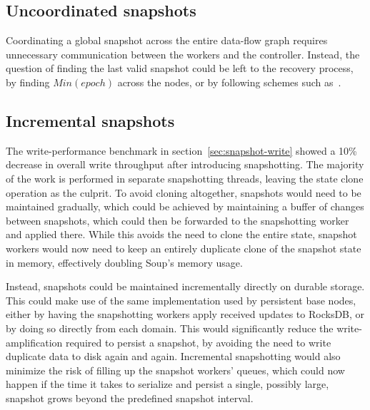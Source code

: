 \subsection{Uncoordinated snapshots}

Coordinating a global snapshot across the entire data-flow graph requires
unnecessary communication between the workers and the controller. Instead, the
question of finding the last valid snapshot could be left to the recovery
process, \eg by finding $ Min(epoch) $ across the nodes, or by following schemes
such as~\cite{falkirk}.

\subsection{Incremental snapshots}

The write-performance benchmark in section~\ref{sec:snapshot-write} showed a
10\% decrease in overall write throughput after introducing snapshotting. The
majority of the work is performed in separate snapshotting threads, leaving the
state clone operation as the culprit. To avoid cloning altogether, snapshots
would need to be maintained gradually, which could be achieved by maintaining a
buffer of changes between snapshots, which could then be forwarded to the
snapshotting worker and applied there. While this avoids the need to clone the
entire state, snapshot workers would now need to keep an entirely duplicate
clone of the snapshot state in memory, effectively doubling Soup's memory usage.

Instead, snapshots could be maintained incrementally directly on durable
storage. This could make use of the same  implementation
used by persistent base nodes, either by having the snapshotting workers apply
received updates to RocksDB, or by doing so directly from each domain. This
would significantly reduce the write-amplification required to persist a
snapshot, by avoiding the need to write duplicate data to disk again and again.
Incremental snapshotting would also minimize the risk of filling up the snapshot
workers' queues, which could now happen if the time it takes to serialize and
persist a single, possibly large, snapshot grows beyond the predefined snapshot
interval.
